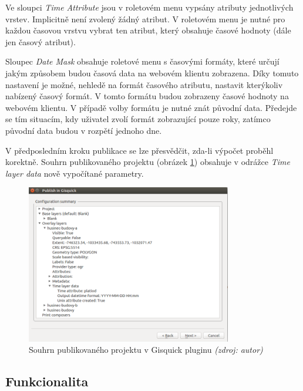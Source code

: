 Ve sloupci \textit{Time Attribute} jsou v roletovém menu vypsány
atributy jednotlivých vrstev. Implicitně není zvolený žádný atribut. 
V roletovém menu je nutné pro každou časovou vrstvu vybrat ten 
atribut, který obsahuje časové hodnoty (dále jen časový atribut).

Sloupec \textit{Date Mask} obsahuje roletové menu s časovými formáty,
které určují jakým způsobem budou časová data na webovém klientu
zobrazena. Díky tomuto nastavení je možné, nehledě na formát časového
atributu, nastavit kterýkoliv nabízený časový formát. V tomto formátu
budou zobrazeny časové hodnoty na webovém klientu. V případě volby
formátu je nutné znát původní data. Předejde se tím situacím, kdy
uživatel zvolí formát zobrazující pouze roky, zatímco původní data
budou v rozpětí jednoho dne.

V předposledním kroku publikace se lze přesvědčit, zda-li výpočet 
proběhl korektně. Souhrn publikovaného projektu (obrázek 
\ref{fig:summary}) obsahuje v odrážce \textit{Time layer data} nově 
vypočítané parametry.

\begin{figure}[h!]
	\centering
	\includegraphics[width=0.8\textwidth]{./img/project-publishing-time-summary.png}
	\caption{Souhrn publikovaného projektu v Gisquick pluginu \textit{(zdroj: autor)}}
	\label{fig:summary}
\end{figure}

\subsection{Funkcionalita}
\label{sssec:plugin-functionality}

